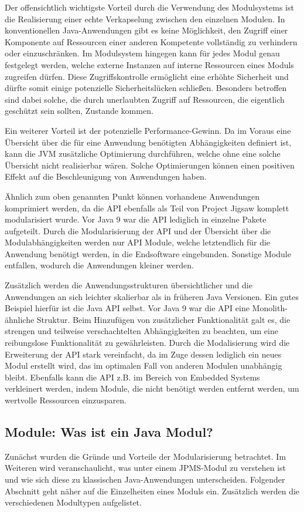 Der offensichtlich wichtigste Vorteil durch die Verwendung des Modulsystems ist die Realisierung einer echte Verkapselung zwischen den einzelnen Modulen.
In konventionellen Java-Anwendungen gibt es keine Möglichkeit, den Zugriff einer Komponente auf Ressourcen einer anderen Kompetente vollständig zu verhindern oder einzuschränken. 
Im Modulsystem hingegen kann für jedes Modul genau festgelegt werden, welche externe Instanzen auf interne Ressourcen eines Moduls zugreifen dürfen.
Diese Zugriffskontrolle ermöglicht eine erhöhte Sicherheit und dürfte somit einige potenzielle Sicherheitslücken schließen. 
Besonders betroffen sind dabei solche, die durch unerlaubten Zugriff auf Ressourcen, die eigentlich geschützt sein sollten, Zustande kommen.

Ein weiterer Vorteil ist der potenzielle Performance-Gewinn.
Da im Voraus eine Übersicht über die für eine Anwendung benötigten Abhängigkeiten definiert ist, kann die JVM zusätzliche Optimierung durchführen, welche ohne eine solche Übersicht nicht realisierbar wären. 
Solche Optimierungen können einen positiven Effekt auf die Beschleunigung von Anwendungen haben.

Ähnlich zum oben genannten Punkt können vorhandene Anwendungen komprimiert werden, da die API ebenfalls als Teil von Project Jigsaw komplett modularisiert wurde. 
Vor Java 9 war die API lediglich in einzelne Pakete aufgeteilt. 
Durch die Modularisierung der API und der Übersicht über die Modulabhängigkeiten werden nur API Module, welche letztendlich für die Anwendung benötigt werden, in die Endsoftware eingebunden. 
Sonstige Module entfallen, wodurch die Anwendungen kleiner werden.

Zusätzlich werden die Anwendungsstrukturen übersichtlicher und die Anwendungen an sich leichter skalierbar als in früheren Java Versionen. 
Ein gutes Beispiel hierfür ist die Java API selbst. 
Vor Java 9 war die API eine Monolith-ähnliche Struktur.
Beim Hinzufügen von zusätzlicher Funktionalität galt es, die strengen und teilweise verschachtelten Abhängigkeiten zu beachten, um eine reibungslose Funktionalität zu gewährleisten. 
Durch die Modalisierung wird die Erweiterung der API stark vereinfacht, da im Zuge dessen lediglich ein neues Modul erstellt wird, das im optimalen Fall von anderen Modulen unabhängig bleibt.
Ebenfalls kann die API z.B. im Bereich von Embedded Systems verkleinert werden, indem Module, die nicht benötigt werden entfernt werden, um wertvolle Ressourcen einzusparen.


\subsection{Module: Was ist ein Java Modul?}
Zunächst wurden die Gründe und Vorteile der Modularisierung betrachtet. 
Im Weiteren wird veranschaulicht, was unter einem JPMS-Modul zu verstehen ist und wie sich diese zu klassischen Java-Anwendungen unterscheiden. 
Folgender Abschnitt geht näher auf die Einzelheiten eines Moduls ein. 
Zusätzlich werden die verschiedenen Modultypen aufgelistet.

